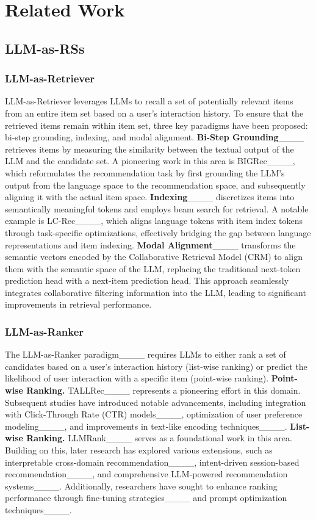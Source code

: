 \section{Related Work}
\subsection{LLM-as-RSs}

\subsubsection{LLM-as-Retriever}
LLM-as-Retriever leverages LLMs to recall a set of potentially relevant items from an entire item set based on a user's interaction history. To ensure that the retrieved items remain within item set, three key paradigms have been proposed: bi-step grounding, indexing, and modal alignment.
\textbf{Bi-Step Grounding}____ retrieves items by measuring the similarity between the textual output of the LLM and the candidate set. A pioneering work in this area is BIGRec____, which reformulates the recommendation task by first grounding the LLM’s output from the language space to the recommendation space, and subsequently aligning it with the actual item space.
\textbf{Indexing}____ discretizes items into semantically meaningful tokens and employs beam search for retrieval. A notable example is LC-Rec____, which aligns language tokens with item index tokens through task-specific optimizations, effectively bridging the gap between language representations and item indexing.
\textbf{Modal Alignment}____ transforms the semantic vectors encoded by the Collaborative Retrieval Model (CRM) to align them with the semantic space of the LLM, replacing the traditional next-token prediction head with a next-item prediction head. This approach seamlessly integrates collaborative filtering information into the LLM, leading to significant improvements in retrieval performance.

\subsubsection{LLM-as-Ranker}
The LLM-as-Ranker paradigm____ requires LLMs to either rank a set of candidates based on a user's interaction history (list-wise ranking) or predict the likelihood of user interaction with a specific item (point-wise ranking).
\textbf{Point-wise Ranking.} TALLRec____ represents a pioneering effort in this domain. Subsequent studies have introduced notable advancements, including integration with Click-Through Rate (CTR) models____, optimization of user preference modeling____, and improvements in text-like encoding techniques____.
\textbf{List-wise Ranking.} LLMRank____ serves as a foundational work in this area. Building on this, later research has explored various extensions, such as interpretable cross-domain recommendation____, intent-driven session-based recommendation____, and comprehensive LLM-powered recommendation systems____. Additionally, researchers have sought to enhance ranking performance through fine-tuning strategies____ and prompt optimization techniques____.

